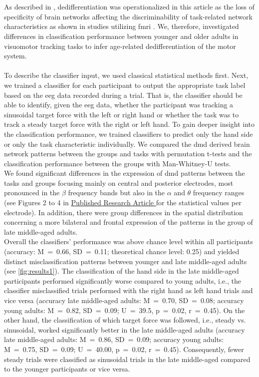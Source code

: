 \hyperref[pub:paperI]{}\\
\\
As described in , dedifferentiation was operationalized in this article as the loss of specificity of brain networks affecting the discriminability of task-related network characteristics as shown in studies utilizing \gls{fmri} \cite{Koen2019,Carb2011}. We, therefore, investigated differences in classification performance between younger and older adults in visuomotor tracking tasks to infer age-related dedifferentiation of the motor system.\\
\\
To describe the classifier input, we used classical statistical methods first. Next, we trained a classifier for each participant to output the appropriate task label based on the \gls{eeg} data recorded during a trial. That is, the classifier should be able to identify, given the \gls{eeg} data, whether the participant was tracking a sinusoidal target force with the left or right hand or whether the task was to track a steady target force with the right or left hand. To gain deeper insight into the classification performance, we trained classifiers to predict only the hand side or only the task characteristic individually. We compared the \gls{dmd} derived brain network patterns between the groups and tasks with permutation t-tests and the classification performance between the groups with Man-Whitney-U tests.\\
\newpage
\noindent We found significant differences in the expression of \gls{dmd} patterns between the tasks and groups focusing mainly on central and posterior electrodes, most pronounced in the $\beta$ frequency bands but also in the $\alpha$ and $\theta$ frequency ranges (see Figures 2 to 4 in \hyperref[pub:paperI]{Published Research Article } for the statistical values per electrode). In addition, there were group differences in the spatial distribution concerning a more bilateral and frontal expression of the patterns in the group of late middle-aged adults.\\
Overall the classifiers' performance was above chance level within all participants (accuracy: M~=~0.66, SD~=~0.11; theoretical chance level: 0.25) and yielded distinct misclassification patterns between younger and late middle-aged adults (see \autoref{fig:results1}). The classification of the hand side in the late middle-aged participants performed significantly worse compared to young adults, i.e., the classifier misclassified trials performed with the right hand as left hand trials and vice versa (accuracy late middle-aged adults: M~=~0.70, SD~=~0.08; accuracy young adults: M~=~0.82, SD~=~0.09; U~=~39.5, p~=~0.02, r~=~0.45). On the other hand, the classification of which target force was followed, i.e., steady vs. sinusoidal, worked significantly better in the late middle-aged adults (accuracy late middle-aged adults: M~=~0.86, SD~=~0.09; accuracy young adults: M~=~0.75, SD~=~0.09; U~=~40.00, p~=~0.02, r~=~0.45). Consequently, fewer steady trials were classified as sinusoidal trials in the late middle-aged compared to the younger participants or vice versa.

